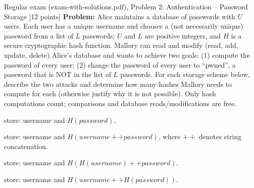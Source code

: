 \documentclass[12pt, a4paper]{article}
\begin{document}
\begin{practicebox}{Regular exam (exam-with-solutions.pdf), Problem 2: Authentication -- Password Storage [12 points]}
\textbf{Problem:} Alice maintains a database of passwords with $U$ users. Each user has a unique username and chooses a (not necessarily unique) password from a list of $L$ passwords; $U$ and $L$ are positive integers, and $H$ is a secure cryptographic hash function. Mallory can read and modify (read, add, update, delete) Alice's database and wants to achieve two goals: (1) compute the password of every user; (2) change the password of every user to ``pwned'', a password that is NOT in the list of $L$ passwords. For each storage scheme below, describe the two attacks and determine how many hashes Mallory needs to compute for each (otherwise justify why it is not possible). Only hash computations count; comparisons and database reads/modifications are free.
\begin{tightitem}
\item[(a)] [3p] store: username and $H(password)$.
\item[(b)] [3p] store: username and $H(username ++ password)$, where $++$ denotes string concatenation.
\item[(c)] [3p] store: username and $H(H(username) ++ password)$.
\item[(d)] [3p] store: username and $H(username ++ H(password))$.
\end{tightitem}


\end{practicebox}
\end{document}

